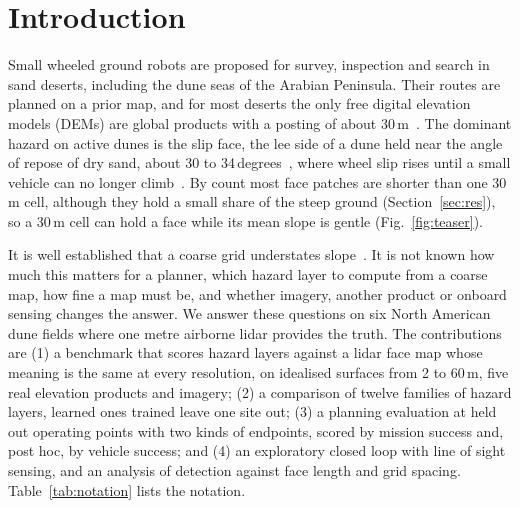 \section{Introduction}
Small wheeled ground robots are proposed for survey, inspection and search in sand deserts, including the dune seas of the Arabian Peninsula. Their routes are planned on a prior map, and for most deserts the only free digital elevation models (DEMs) are global products with a posting of about 30\,m~\cite{copernicusdem,tadono2014aw3d,hawker2022fabdem}. The dominant hazard on active dunes is the slip face, the lee side of a dune held near the angle of repose of dry sand, about 30 to 34\,degrees~\cite{pye2009}, where wheel slip rises until a small vehicle can no longer climb~\cite{heverly2013,arvidson2017megaripple}. By count most face patches are shorter than one 30\,m cell, although they hold a small share of the steep ground (Section~\ref{sec:res}), so a 30\,m cell can hold a face while its mean slope is gentle (Fig.~\ref{fig:teaser}).

It is well established that a coarse grid understates slope~\cite{zhang1994}. It is not known how much this matters for a planner, which hazard layer to compute from a coarse map, how fine a map must be, and whether imagery, another product or onboard sensing changes the answer. We answer these questions on six North American dune fields where one metre airborne lidar provides the truth. The contributions are (1) a benchmark that scores hazard layers against a lidar face map whose meaning is the same at every resolution, on idealised surfaces from 2 to 60\,m, five real elevation products and imagery; (2) a comparison of twelve families of hazard layers, learned ones trained leave one site out; (3) a planning evaluation at held out operating points with two kinds of endpoints, scored by mission success and, post hoc, by vehicle success; and (4) an exploratory closed loop with line of sight sensing, and an analysis of detection against face length and grid spacing. Table~\ref{tab:notation} lists the notation.
